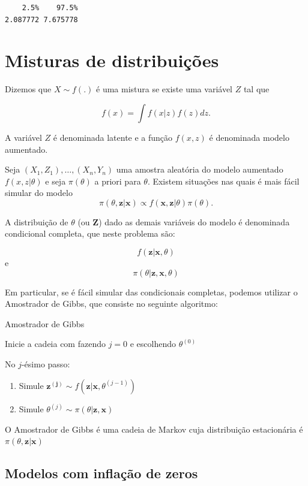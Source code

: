 \documentclass[
  letterpaper,
  DIV=11,
  numbers=noendperiod]{scrreprt}
\theoremstyle{definition}
\theoremstyle{definition}
\theoremstyle{plain}
\theoremstyle{remark}
\begin{document}
\begin{verbatim}
    2.5%    97.5% 
2.087772 7.675778 
\end{verbatim}


\chapter{Misturas de
distribuições}\label{misturas-de-distribuiuxe7uxf5es}

Dizemos que \(X\sim f(.)\) é uma mistura se existe uma variável \(Z\)
tal que

\[f(x)=\int f(x|z)f(z)dz.\]

A variável \(Z\) é denominada latente e a função \(f(x,z)\) é denominada
modelo aumentado.

Seja \((X_1,Z_1),\ldots,(X_n,Y_n)\) uma amostra aleatória do modelo
aumentado \(f(x,z|\theta)\) e seja \(\pi(\theta)\) a priori para
\(\theta\). Existem situações nas quais é mais fácil simular do modelo
\[\pi(\theta,\boldsymbol{z}|\boldsymbol{x})\varpropto f(\boldsymbol{x},\boldsymbol{z}|\theta)\pi(\theta).\]

A distribuição de \(\theta\) (ou \(\boldsymbol{Z}\)) dado as demais
variáveis do modelo é denominada condicional completa, que neste
problema são:

\[f(\boldsymbol{z}|\boldsymbol{x},\theta)\] e
\[\pi(\theta|\boldsymbol{z},\boldsymbol{x},\theta)\]

Em particular, se é fácil simular das condicionais completas, podemos
utilizar o Amostrador de Gibbs, que consiste no seguinte algoritmo:

Amostrador de Gibbs

Inicie a cadeia com fazendo \(j=0\) e escolhendo \(\theta^{(0)}\)

No \(j\)-ésimo passo:

\begin{enumerate}
\def\labelenumi{\arabic{enumi}.}
\item
  Simule
  \(\boldsymbol{z^{(j)}}\sim f(\boldsymbol{z}|\boldsymbol{x},\theta^{(j-1)})\)
\item
  Simule \(\theta^{(j)}\sim \pi(\theta|\boldsymbol{z},\boldsymbol{x})\)
\end{enumerate}

O Amostrador de Gibbs é uma cadeia de Markov cuja distribuição
estacionária é \(\pi(\theta,\boldsymbol{z}|\boldsymbol{x})\)

\section{Modelos com inflação de
zeros}\label{modelos-com-inflauxe7uxe3o-de-zeros}
\end{document}
